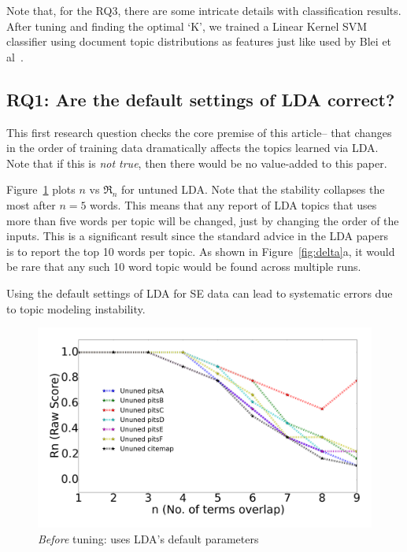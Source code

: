 \documentclass[twocolumn,5p,sort&compress]{elsarticle}
\theoremstyle{break}
\begin{document}
  Note that, for the RQ3, there are some intricate details with classification results. After tuning and finding the optimal `K', we trained a Linear Kernel SVM classifier using document topic distributions as features just like used by Blei et al~\cite{blei2003latent}.


\subsection{\textbf{RQ1: Are the default settings of LDA correct?}}\label{sect:unstable}


This first research question checks the core premise of this article-- that changes
in the order of training data dramatically affects the topics learned via LDA.
Note that if this is {\em not true}, then there would be no value-added to this paper.


Figure~\ref{fig:delta11}   plots $n$ vs $\Re_n$ for untuned  LDA.
Note that the  stability collapses the most after $n=5$ words. This means
  that any report of LDA topics that uses more than five words per topic will
  be changed, just by changing the order of the inputs. This is a significant result
  since the standard advice in the LDA papers~\cite{panichella2013effectively, lukins2010bug}
  is to report the top 10 words per topic. As shown in Figure~\ref{fig:delta}a, it would
  be rare that any such 10 word topic would be found across multiple runs.
  
\begin{lesson}
  Using the default settings of LDA for SE data can lead to systematic errors due to topic
  modeling instability. 
\end{lesson}

\begin{figure}[!htbp]
  \begin{center}
    \includegraphics[width=\linewidth]{./fig/Vem_untuned.png}
    \end{center}
  \caption{{\em Before} tuning: uses LDA's default parameters}\label{fig:delta11}  
\end{figure}
\end{document}
